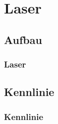 \section{Laser}
\subsection{Aufbau}
\begin{frame}
\frametitle{Laser}
  
\end{frame}

\subsection{Kennlinie}

\begin{frame}
\frametitle{Kennlinie}
  
\end{frame}